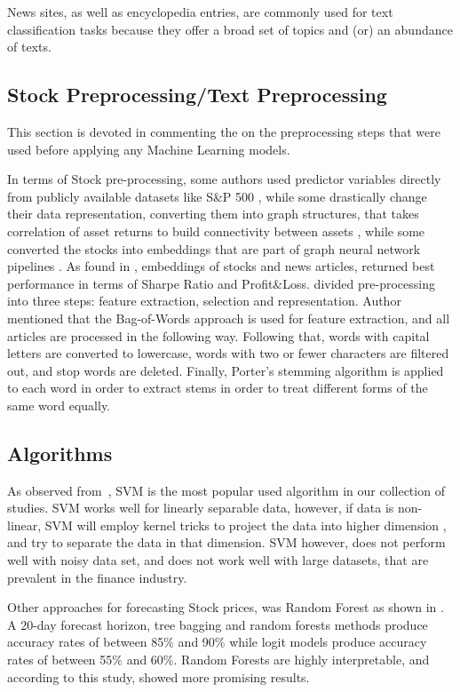 \documentclass[11pt]{article}
\begin{document}
News sites, as well as encyclopedia entries, are commonly used for text classification tasks because they offer a broad set of topics and (or) an abundance of texts.


\subsection{Stock Preprocessing/Text Preprocessing} \label{S:preprocessing}
This section is devoted in commenting the on the preprocessing steps that were used before applying any Machine Learning models. 

In terms of Stock pre-processing, some authors used predictor variables directly from publicly available datasets like S\&P 500 \citep[see][]{Feng2018}, while some drastically change their data representation, converting them into graph structures, that takes correlation of asset returns to build connectivity between assets \citep[see][]{son2022,Uddin2021}, while some converted the stocks into embeddings that are part of graph neural network pipelines \citep[see][]{Wu2019}. As found in \cite{Wu2019}, embeddings of stocks and news articles, returned best performance in terms of Sharpe Ratio and Profit\&Loss. \cite{Shynkevich2015} divided pre-processing into three steps: feature extraction, selection and representation. Author mentioned that the Bag-of-Words approach is used for feature extraction, and all articles are processed in the following way. Following that, words with capital letters are converted to lowercase, words with two or fewer characters are filtered out, and stop words are deleted. Finally, Porter's stemming algorithm is applied to each word in order to extract stems in order to treat different forms of the same word equally.

\subsection{Algorithms} \label{S:algorithms}
As observed from~, SVM is the most popular used algorithm in our collection of studies. SVM works well for linearly separable data, however, if data is non-linear, SVM will employ kernel tricks to project the data into higher dimension , and try to separate the data in that dimension. SVM however, does not perform well with noisy data set, and does not work well with large datasets, that are prevalent in the finance industry. 

Other approaches for forecasting Stock prices, was Random Forest as shown in \cite{sadorsky2021}. A 20-day forecast horizon, tree bagging and random forests methods produce accuracy rates of between 85\% and 90\% while logit models produce accuracy rates of between 55\% and 60\%. Random Forests are highly interpretable, and according to this study, showed more promising results. 
\end{document}
